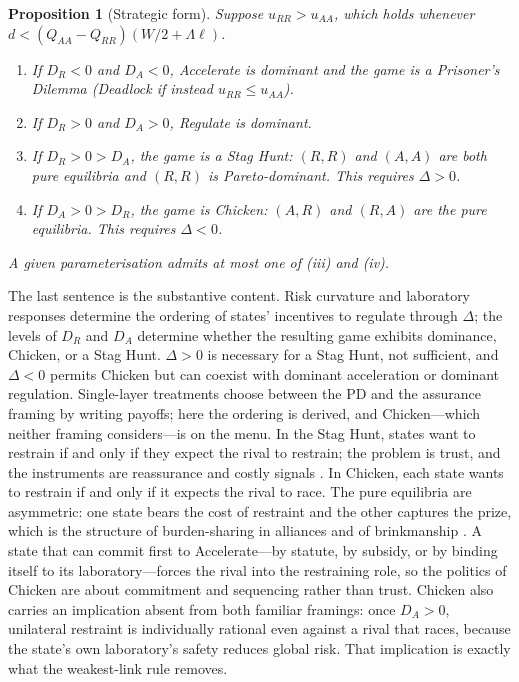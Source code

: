 \documentclass[11pt]{article}
\theoremstyle{plain}
\newtheorem{proposition}{Proposition}
\theoremstyle{definition}
\theoremstyle{remark}
\newcommand{\Lam}{\Lambda}
\newcommand{\Delt}{\Delta}
\begin{document}
\begin{proposition}[Strategic form]
Suppose $u_{RR}>u_{AA}$, which holds whenever $d<(Q_{AA}-Q_{RR})(W/2+\Lam\ell)$.
\begin{enumerate}
\item[(i)] If $D_R<0$ and $D_A<0$, Accelerate is dominant and the game is a Prisoner's Dilemma (Deadlock if instead $u_{RR}\le u_{AA}$).
\item[(ii)] If $D_R>0$ and $D_A>0$, Regulate is dominant.
\item[(iii)] If $D_R>0>D_A$, the game is a Stag Hunt: $(R,R)$ and $(A,A)$ are both pure equilibria and $(R,R)$ is Pareto-dominant. This requires $\Delt>0$.
\item[(iv)] If $D_A>0>D_R$, the game is Chicken: $(A,R)$ and $(R,A)$ are the pure equilibria. This requires $\Delt<0$.
\end{enumerate}
A given parameterisation admits at most one of (iii) and (iv).
\end{proposition}

The last sentence is the substantive content. Risk curvature and laboratory responses determine the ordering of states' incentives to regulate through $\Delt$; the levels of $D_R$ and $D_A$ determine whether the resulting game exhibits dominance, Chicken, or a Stag Hunt. $\Delt>0$ is necessary for a Stag Hunt, not sufficient, and $\Delt<0$ permits Chicken but can coexist with dominant acceleration or dominant regulation. Single-layer treatments choose between the PD and the assurance framing by writing payoffs; here the ordering is derived, and Chicken---which neither framing considers---is on the menu. In the Stag Hunt, states want to restrain if and only if they expect the rival to restrain; the problem is trust, and the instruments are reassurance and costly signals \citep{kydd2000}. In Chicken, each state wants to restrain if and only if it expects the rival to race. The pure equilibria are asymmetric: one state bears the cost of restraint and the other captures the prize, which is the structure of burden-sharing in alliances \citep{olson1966} and of brinkmanship \citep{schelling1966}. A state that can commit first to Accelerate---by statute, by subsidy, or by binding itself to its laboratory---forces the rival into the restraining role, so the politics of Chicken are about commitment and sequencing rather than trust. Chicken also carries an implication absent from both familiar framings: once $D_A>0$, unilateral restraint is individually rational even against a rival that races, because the state's own laboratory's safety reduces global risk. That implication is exactly what the weakest-link rule removes.
\end{document}

